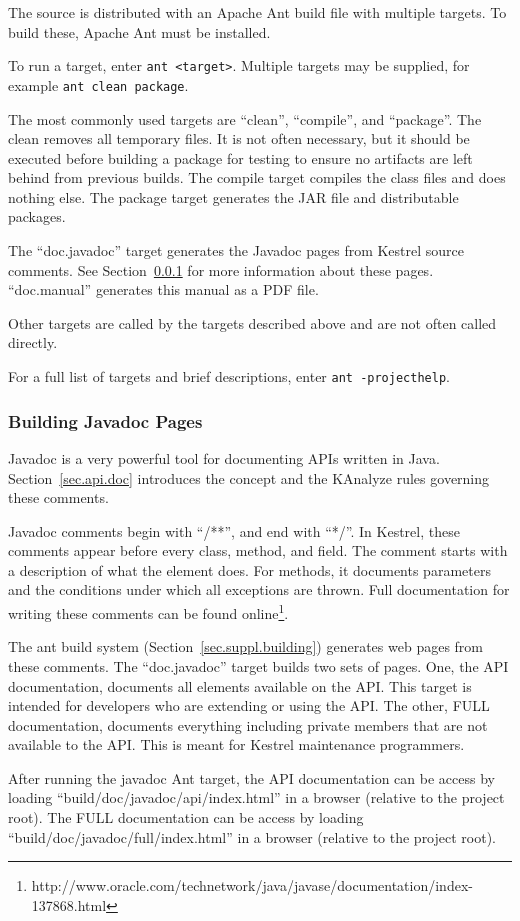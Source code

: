 The source is distributed with an Apache Ant build file with multiple targets. To build these, Apache Ant must be installed.

To run a target, enter \texttt{ant <target>}. Multiple targets may be supplied, for example \texttt{ant clean package}.

The most commonly used targets are ``clean'', ``compile'', and ``package''. The clean removes all temporary files. It is not often necessary, but it should be executed before building a package for testing to ensure no artifacts are left behind from previous builds. The compile target compiles the class files and does nothing else. The package target generates the JAR file and distributable packages.

The ``doc.javadoc'' target generates the Javadoc pages from Kestrel source comments. See Section~\ref{sec.suppl.building.javadoc} for more information about these pages. ``doc.manual'' generates this manual as a PDF file.

Other targets are called by the targets described above and are not often called directly.

For a full list of targets and brief descriptions, enter \texttt{ant -projecthelp}.


\subsubsection{Building Javadoc Pages}
\label{sec.suppl.building.javadoc}

Javadoc is a very powerful tool for documenting APIs written in Java. Section~\ref{sec.api.doc} introduces the concept and the KAnalyze rules governing these comments.

Javadoc comments begin with ``/**'', and end with ``*/''. In Kestrel, these comments appear before every class, method, and field. The comment starts with a description of what the element does. For methods, it documents parameters and the conditions under which all exceptions are thrown. Full documentation for writing these comments can be found online\footnote{http://www.oracle.com/technetwork/java/javase/documentation/index-137868.html}. 

The ant build system (Section~\ref{sec.suppl.building}) generates web pages from these comments. The ``doc.javadoc'' target builds two sets of pages. One, the API documentation, documents all elements available on the API. This target is intended for developers who are extending or using the API. The other, FULL documentation, documents everything including private members that are not available to the API. This is meant for Kestrel maintenance programmers.

After running the javadoc Ant target, the API documentation can be access by loading ``build/doc/javadoc/api/index.html'' in a browser (relative to the project root). The FULL documentation can be access by loading ``build/doc/javadoc/full/index.html'' in a browser (relative to the project root).
